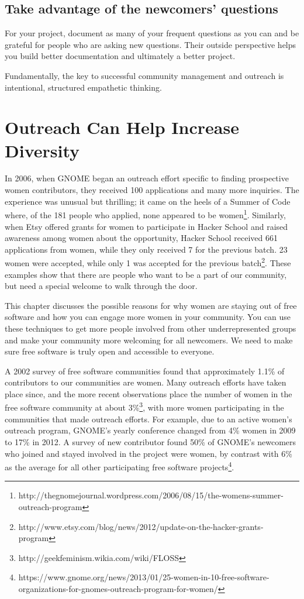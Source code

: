 \subsection{Take advantage of the newcomers’ questions}
For your project, document as many of your frequent questions as you can and be grateful for people who are asking new questions. Their outside perspective helps you build better documentation and ultimately a better project. 

Fundamentally, the key to successful community management and outreach is intentional, structured empathetic thinking.

\section{Outreach Can Help Increase Diversity}
In 2006, when GNOME began an outreach effort specific to finding prospective women contributors, they received 100 applications and many more inquiries. The experience was unusual but thrilling; it came on the heels of a Summer of Code where, of the 181 people who applied, none appeared to be women\footnote{http://thegnomejournal.wordpress.com/2006/08/15/the-womens-summer-outreach-program}. Similarly, when Etsy offered grants for women to participate in Hacker School and raised awareness among women about the opportunity, Hacker School received 661 applications from women, while they only received 7 for the previous batch. 23 women were accepted, while only 1 was accepted for the previous batch\footnote{http://www.etsy.com/blog/news/2012/update-on-the-hacker-grants-program}. These examples show that there are people who want to be a part of our community, but need a special welcome to walk through the door.

This chapter discusses the possible reasons for why women are staying out of free software and how you can engage more women in your community. You can use these techniques to get more people involved from other underrepresented groups and make your community more welcoming for all newcomers. We need to make sure free software is truly open and accessible to everyone.

A 2002 survey of free software communities found that approximately 1.1\% of contributors to our communities are women. Many outreach efforts have taken place since, and the more recent observations place the number of women in the free software community at about 3\%\footnote{http://geekfeminism.wikia.com/wiki/FLOSS}, with more women participating in the communities that made outreach efforts. For example, due to an active women’s outreach program, GNOME’s yearly conference changed from 4\% women in 2009 to 17\% in 2012. A survey of new contributor found 50\% of GNOME’s newcomers who joined and stayed involved in the project were women, by contrast with 6\% as the average for all other participating free software projects\footnote{https://www.gnome.org/news/2013/01/25-women-in-10-free-software-organizations-for-gnomes-outreach-program-for-women/}.

